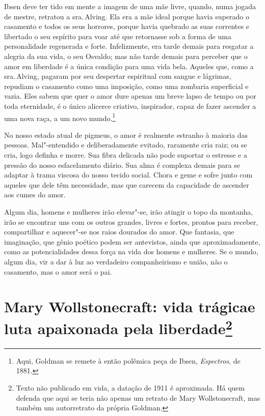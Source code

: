 Ibsen deve ter tido em mente a imagem de uma mãe livre, quando, numa
jogada de mestre, retratou a sra.\,Alving. Ela era a mãe ideal porque
havia superado o casamento e todos os seus horrores, porque havia
quebrado as suas correntes e libertado o seu espírito para voar até que
retornasse sob a forma de uma personalidade regenerada e forte.
Infelizmente, era tarde demais para resgatar a alegria da sua vida, o
seu Osvaldo; mas não tarde demais para perceber que o amor em liberdade
é a única condição para uma vida bela. Aqueles que, como a sra.\,Alving,
pagaram por seu despertar espiritual com sangue e lágrimas, repudiam o
casamento como uma imposição, como uma zombaria superficial e vazia.
Eles sabem que quer o amor dure apenas um breve lapso de tempo ou por
toda eternidade, é o único alicerce criativo, inspirador, capaz de fazer
ascender a uma nova raça, a um novo mundo.\footnote{Aqui, Goldman se remete à então polêmica peça de Ibsen, \textit{Espectros}, de 1881.}

No nosso estado atual de pigmeus, o amor é realmente estranho à maioria
das pessoas. Mal"-entendido e deliberadamente evitado, raramente cria
raiz; ou se cria, logo definha e morre. Sua fibra delicada não pode
suportar o estresse e a pressão do nosso esfacelamento diário. Sua alma é complexa
demais para se adaptar à trama viscosa do nosso tecido social. Chora e
geme e sofre junto com aqueles que dele têm necessidade, mas que carecem
da capacidade de ascender aos cumes do amor.

Algum dia, homens e mulheres irão elevar"-se, irão atingir o topo da
montanha, irão se encontrar uns com os outros grandes, livres e fortes,
prontos para receber, compartilhar e aquecer"-se nos raios dourados do
amor. Que fantasia, que imaginação, que gênio poético podem ser antevistos, ainda que aproximadamente, como as potencialidades dessa força na vida
dos homens e mulheres. Se o mundo, algum dia, vir a dar à luz ao verdadeiro
companheirismo e união, não o casamento, mas o amor será o pai.

\chapter[Mary Wollstonecraft: vida trágica e luta apaixonada pela liberdade]{Mary Wollstonecraft: vida trágica\break e luta apaixonada pela
liberdade\footnote{Texto não publicado em vida, a datação de 1911 é
  aproximada. Há quem defenda que aqui se teria não apenas um retrato de
  Mary Wollstonecraft, mas também um autorretrato da própria Goldman.}}

